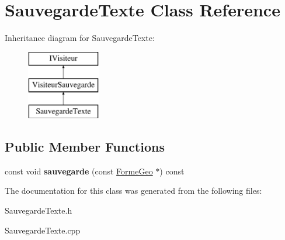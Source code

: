 \hypertarget{class_sauvegarde_texte}{}\section{Sauvegarde\+Texte Class Reference}
\label{class_sauvegarde_texte}
Inheritance diagram for Sauvegarde\+Texte\+:\begin{figure}[H]
\begin{center}
\leavevmode
\includegraphics[height=3.000000cm]{de/d34/class_sauvegarde_texte}
\end{center}
\end{figure}
\subsection*{Public Member Functions}
\begin{DoxyCompactItemize}
\item 
\mbox{\label{class_sauvegarde_texte_a07be1402c8a88eb97fdecd2a54fd385b}} 
const void {\bfseries sauvegarde} (const \mbox{\hyperlink{class_forme_geo}{Forme\+Geo}} $\ast$) const
\end{DoxyCompactItemize}


The documentation for this class was generated from the following files\+:\begin{DoxyCompactItemize}
\item 
Sauvegarde\+Texte.\+h\item 
Sauvegarde\+Texte.\+cpp\end{DoxyCompactItemize}
